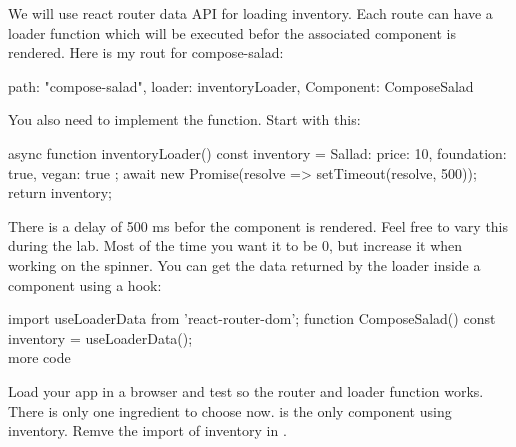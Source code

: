 \documentclass[fleqn, article, a4paper]{memoir}
\begin{document}
\begin{Assignments}
\item We will use react router data API for loading inventory. Each route can have a loader function which will be executed befor the associated component is rendered. Here is my rout for compose-salad:
\begin{Code}
{
  path: "compose-salad",
  loader: inventoryLoader,
  Component: ComposeSalad
}
\end{Code}
You also need to implement the  function. Start with this:
\begin{Code}
async function inventoryLoader() {
  const inventory = { Sallad: { price: 10, foundation: true, vegan: true } };
  await new Promise(resolve => setTimeout(resolve, 500));
  return inventory;
}
\end{Code}
There is a delay of 500 ms befor the component is rendered. Feel free to vary this during the lab. Most of the time you want it to be 0, but increase it when working on the spinner. You can get the data returned by the loader inside a component using a hook:
\begin{Code}
import { useLoaderData } from 'react-router-dom';
function ComposeSalad() {
  const inventory = useLoaderData();
  \\ more code
}
\end{Code}
Load your app in a browser and test so the router and loader function works. There is only one ingredient to choose now.  is the only component using inventory. Remve the import of {inventory} in .  


\end{Assignments}
\end{document}
